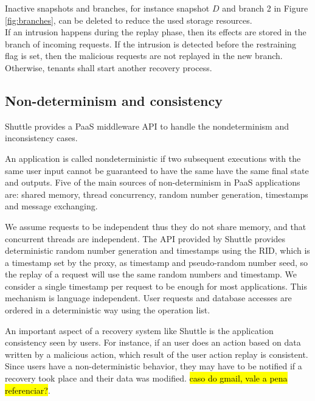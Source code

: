 Inactive snapshots and branches, for instance snapshot $D$ and branch 2 in Figure \ref{fig:branches}, can be deleted to reduce the used storage resources. \\

If an intrusion happens during the replay phase, then its effects are stored in the branch of incoming requests. If the intrusion is detected before the restraining flag is set, then the malicious requests are not replayed in the new branch. Otherwise, tenants shall start another recovery process.












\subsection{Non-determinism and consistency}
\label{sec:arch:consistency}

Shuttle provides a \ac{PaaS} middleware \ac{API} to handle the nondeterminism and inconsistency cases.

An application is called nondeterministic if two subsequent executions with the same user input cannot be guaranteed to have the same have the same final state and outputs. Five of the main sources of non-determinism in \ac{PaaS} applications are: shared memory, thread concurrency, random number generation, timestamps and message exchanging.

We assume requests to be independent thus they do not share memory, and that concurrent threads are independent. The \ac{API} provided by Shuttle provides deterministic random number generation and timestamps using the \acf{RID}, which is a timestamp set by the proxy, as timestamp and pseudo-random number seed, so the replay of a request will use the same random numbers and timestamp. We consider a single timestamp per request to be enough for most applications. This mechanism is language independent. User requests and database accesses are ordered in a deterministic way using the operation list. 

An important aspect of a recovery system like Shuttle is the application consistency seen by users. For instance, if an user does an action based on data written by a malicious action, which result of the user action replay is consistent. Since users have a non-deterministic behavior, they may have to be notified if a recovery took place and their data was modified. \hl{caso do gmail, vale a pena referenciar?}. \\



